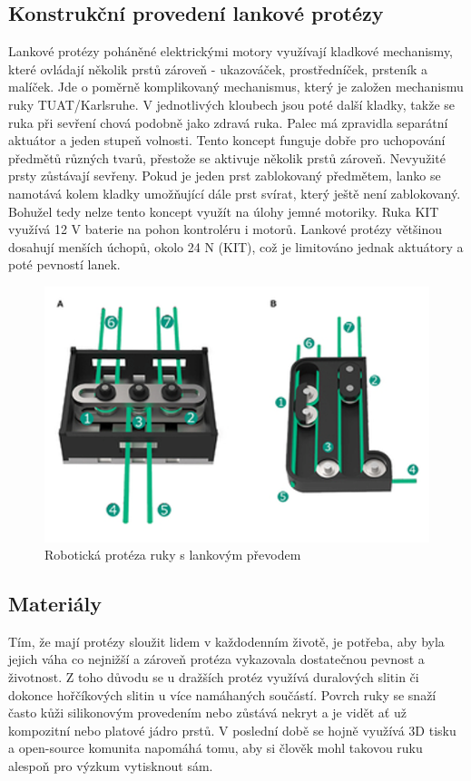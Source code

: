 \documentclass[a4paper,12pt]{article}
\begin{document}
\subsection{Konstrukční provedení lankové protézy}
Lankové protézy poháněné elektrickými motory využívají kladkové mechanismy, které ovládají několik prstů zároveň - ukazováček, prostředníček, prsteník a malíček. Jde o poměrně komplikovaný mechanismus, který je založen mechanismu ruky TUAT/Karlsruhe. V jednotlivých kloubech jsou poté další kladky, takže se ruka při sevření chová podobně jako zdravá ruka. Palec má zpravidla separátní aktuátor a jeden stupeň volnosti. Tento koncept funguje dobře pro uchopování předmětů různých tvarů, přestože se aktivuje několik prstů zároveň. Nevyužité prsty zůstávají sevřeny. Pokud je jeden prst zablokovaný předmětem, lanko se namotává kolem kladky umožňující dále prst svírat, který ještě není zablokovaný. Bohužel tedy nelze tento koncept využít na úlohy jemné motoriky. Ruka KIT využívá 12 V baterie na pohon kontroléru i motorů. Lankové protézy většinou dosahují menších úchopů, okolo 24 N (KIT), což je limitováno jednak aktuátory a poté pevností lanek.\cite{KIT}
\begin{figure}[hbtp]
\centering
\includegraphics[scale=0.85]{figures/KIT_string_hand.PNG}
\caption{Robotická protéza ruky s lankovým převodem \cite{KIT}}
\end{figure}

\subsection{Materiály}
Tím, že mají protézy sloužit lidem v každodenním životě, je potřeba, aby byla jejich váha co nejnižší a zároveň protéza vykazovala dostatečnou pevnost a životnost. Z toho důvodu se u dražších protéz využívá duralových slitin či dokonce hořčíkových slitin u více namáhaných součástí. Povrch ruky se snaží často kůži silikonovým provedením nebo zůstává nekryt a je vidět ať už kompozitní nebo platové jádro prstů. V poslední době se hojně využívá 3D tisku a open-source komunita napomáhá tomu, aby si člověk mohl takovou ruku alespoň pro výzkum vytisknout sám.\cite{Chappell}\cite{3DPRINT}
\pagebreak
\end{document}

